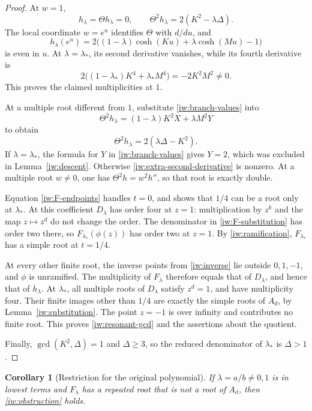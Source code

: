 \documentclass[11pt,a4paper]{article}
\newtheorem{corollary}[theorem]{Corollary}
\theoremstyle{definition}
\theoremstyle{remark}
\begin{document}
\begin{proof}
At \(w=1\),
\[
 h_\lambda=\Theta h_\lambda=0,\qquad
 \Theta^2h_\lambda=2(K^2-\lambda\Delta).
 \tag{\(\dagger\)}
\]
The local coordinate \(w=e^u\) identifies \(\Theta\) with
\(d/du\), and
\[
 h_\lambda(e^u)
 =2\bigl((1-\lambda)\cosh(Ku)+\lambda\cosh(Mu)-1\bigr)
\]
is even in \(u\). At \(\lambda=\lambda_*\), its second
derivative vanishes, while its fourth derivative is
\[
 2\bigl((1-\lambda_*)K^4+\lambda_*M^4\bigr)
 =-2K^2M^2\ne0.
 \tag{\(\ddagger\)}
\]
This proves the claimed multiplicities at \(1\).

At a multiple root different from \(1\), substitute
\eqref{iw:branch-values} into
\[
 \Theta^2h_\lambda=(1-\lambda)K^2X+\lambda M^2Y
\]
to obtain
\begin{equation}\label{iw:extra-second-derivative}
 \Theta^2h_\lambda=2(\lambda\Delta-K^2).
\end{equation}
If \(\lambda=\lambda_*\), the formula for \(Y\) in
\eqref{iw:branch-values} gives \(Y=2\), which was excluded in
Lemma~\ref{iw:descent}. Otherwise
\eqref{iw:extra-second-derivative} is nonzero. At a multiple
root \(w\ne0\), one has \(\Theta^2h=w^2h''\), so that root is
exactly double.

Equation \eqref{iw:F-endpoints} handles \(t=0\), and shows that
\(1/4\) can be a root only at \(\lambda_*\). At this coefficient
\(D_\lambda\) has order four at \(z=1\): multiplication by \(z^k\)
and the map \(z\mapsto z^d\) do not change the order.
The denominator in \eqref{iw:F-substitution} has order two there,
so \(F_{\lambda_*}(\phi(z))\) has order two at \(z=1\).
By \eqref{iw:ramification}, \(F_{\lambda_*}\) has a simple root
at \(t=1/4\).

At every other finite root, the inverse points from
\eqref{iw:inverse} lie outside \(0,1,-1\), and \(\phi\) is
unramified. The multiplicity of \(F_\lambda\) therefore equals
that of \(D_\lambda\), and hence that of \(h_\lambda\).
At \(\lambda_*\), all multiple roots of \(D_\lambda\) satisfy
\(z^d=1\), and have multiplicity four. Their finite images other
than \(1/4\) are exactly the simple roots of \(A_d\), by
Lemma~\ref{iw:substitution}. The point \(z=-1\) is over infinity
and contributes no finite root. This proves
\eqref{iw:resonant-gcd} and the assertions about the quotient.

Finally, \(\gcd(K^2,\Delta)=1\) and \(\Delta\ge3\), so the
reduced denominator of \(\lambda_*\) is \(\Delta>1\).
\end{proof}

\begin{corollary}[Restriction for the original polynomial]
\label{iw:restriction-F}
If \(\lambda=a/b\ne0,1\) is in lowest terms and \(F_\lambda\)
has a repeated root that is not a root of \(A_d\), then
\eqref{iw:obstruction} holds.
\end{corollary}
\end{document}
